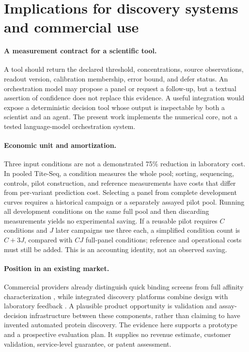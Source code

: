 \documentclass[11pt,letterpaper]{article}
\begin{document}
\section{Implications for discovery systems and commercial use}
\paragraph{A measurement contract for a scientific tool.}
A tool should return the declared threshold, concentrations, source observations, readout version, calibration membership, error bound, and defer status. An orchestration model may propose a panel or request a follow-up, but a textual assertion of confidence does not replace this evidence. A useful integration would expose a deterministic decision tool whose output is inspectable by both a scientist and an agent. The present work implements the numerical core, not a tested language-model orchestration system.

\paragraph{Economic unit and amortization.}
Three input conditions are not a demonstrated 75\% reduction in laboratory cost. In pooled Tite-Seq, a condition measures the whole pool; sorting, sequencing, controls, pilot construction, and reference measurements have costs that differ from per-variant prediction cost. Selecting a panel from complete development curves requires a historical campaign or a separately assayed pilot pool. Running all development conditions on the same full pool and then discarding measurements yields no experimental saving. If a reusable pilot requires $C$ conditions and $J$ later campaigns use three each, a simplified condition count is $C+3J$, compared with $CJ$ full-panel conditions; reference and operational costs must still be added. This is an accounting identity, not an observed saving.

\paragraph{Position in an existing market.}
Commercial providers already distinguish quick binding screens from full affinity characterization \citep{adaptyv}, while integrated discovery platforms combine design with laboratory feedback \citep{absci}. A plausible product opportunity is validation and assay-decision infrastructure between these components, rather than claiming to have invented automated protein discovery. The evidence here supports a prototype and a prospective evaluation plan. It supplies no revenue estimate, customer validation, service-level guarantee, or patent assessment.
\end{document}
